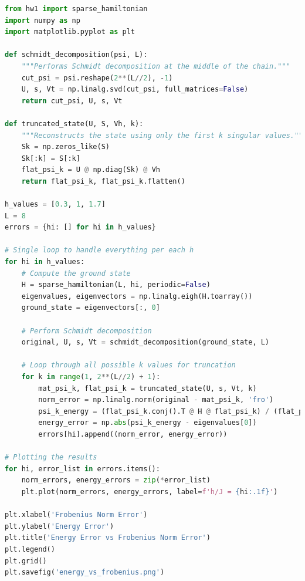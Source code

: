 \documentclass[12pt]{article}
\begin{document}
\begin{lstlisting}[language=Python]
from hw1 import sparse_hamiltonian
import numpy as np
import matplotlib.pyplot as plt

def schmidt_decomposition(psi, L):
    """Performs Schmidt decomposition at the middle of the chain."""
    cut_psi = psi.reshape(2**(L//2), -1)
    U, s, Vt = np.linalg.svd(cut_psi, full_matrices=False)
    return cut_psi, U, s, Vt

def truncated_state(U, S, Vh, k):
    """Reconstructs the state using only the first k singular values."""
    Sk = np.zeros_like(S)
    Sk[:k] = S[:k]
    flat_psi_k = U @ np.diag(Sk) @ Vh
    return flat_psi_k, flat_psi_k.flatten()

h_values = [0.3, 1, 1.7]
L = 8
errors = {hi: [] for hi in h_values}

# Single loop to handle everything per each h
for hi in h_values:
    # Compute the ground state
    H = sparse_hamiltonian(L, hi, periodic=False)
    eigenvalues, eigenvectors = np.linalg.eigh(H.toarray())
    ground_state = eigenvectors[:, 0]
    
    # Perform Schmidt decomposition
    original, U, s, Vt = schmidt_decomposition(ground_state, L)
    
    # Loop through all possible k values for truncation
    for k in range(1, 2**(L//2) + 1):
        mat_psi_k, flat_psi_k = truncated_state(U, s, Vt, k)
        norm_error = np.linalg.norm(original - mat_psi_k, 'fro')
        psi_k_energy = (flat_psi_k.conj().T @ H @ flat_psi_k) / (flat_psi_k.conj().T @ flat_psi_k)
        energy_error = np.abs(psi_k_energy - eigenvalues[0])
        errors[hi].append((norm_error, energy_error))

# Plotting the results
for hi, error_list in errors.items():
    norm_errors, energy_errors = zip(*error_list)
    plt.plot(norm_errors, energy_errors, label=f'h/J = {hi:.1f}')

plt.xlabel('Frobenius Norm Error')
plt.ylabel('Energy Error')
plt.title('Energy Error vs Frobenius Norm Error')
plt.legend()
plt.grid()
plt.savefig('energy_vs_frobenius.png')
\end{lstlisting}
\newpage
\end{document}
